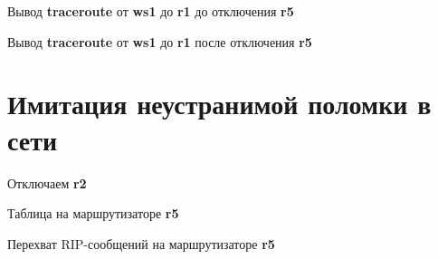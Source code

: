 \documentclass[a4paper,12pt]{article}
\begin{document}
Вывод \textbf{traceroute} от \textbf{ws1} до \textbf{r1} до отключения \textbf{r5}


Вывод \textbf{traceroute} от \textbf{ws1} до \textbf{r1} после отключения \textbf{r5}



\section{Имитация неустранимой поломки в сети}
Отключаем \textbf{r2}


Таблица на маршрутизаторе \textbf{r5}


Перехват RIP-сообщений на маршрутизаторе \textbf{r5}
\end{document}
